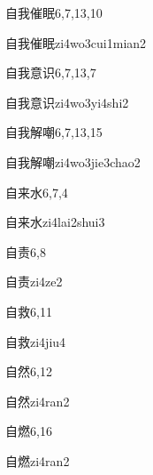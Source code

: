\begin{entry}{自我催眠}{6,7,13,10}
  \begin{phonetics}{自我催眠}{zi4wo3cui1mian2}
  \end{phonetics}
\end{entry}

\begin{entry}{自我意识}{6,7,13,7}
  \begin{phonetics}{自我意识}{zi4wo3yi4shi2}
  \end{phonetics}
\end{entry}

\begin{entry}{自我解嘲}{6,7,13,15}
  \begin{phonetics}{自我解嘲}{zi4wo3jie3chao2}
  \end{phonetics}
\end{entry}

\begin{entry}{自来水}{6,7,4}
  \begin{phonetics}{自来水}{zi4lai2shui3}
  \end{phonetics}
\end{entry}

\begin{entry}{自责}{6,8}
  \begin{phonetics}{自责}{zi4ze2}
  \end{phonetics}
\end{entry}

\begin{entry}{自救}{6,11}
  \begin{phonetics}{自救}{zi4jiu4}
  \end{phonetics}
\end{entry}

\begin{entry}{自然}{6,12}
  \begin{phonetics}{自然}{zi4ran2}
  \end{phonetics}
\end{entry}

\begin{entry}{自燃}{6,16}
  \begin{phonetics}{自燃}{zi4ran2}
  \end{phonetics}
\end{entry}

